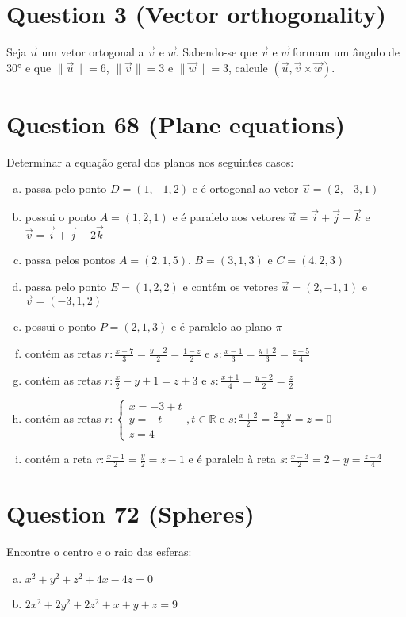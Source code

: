 \documentclass{article}
\begin{document}
\section*{Question 3 (Vector orthogonality)}
Seja $\vec{u}$ um vetor ortogonal a $\vec{v}$ e $\vec{w}$. Sabendo-se que $\vec{v}$ e $\vec{w}$ formam um ângulo de $30°$ e que $\|\vec{u}\| = 6$, $\|\vec{v}\| = 3$ e $\|\vec{w}\| = 3$, calcule $(\vec{u}, \vec{v} \times \vec{w})$.

\section*{Question 68 (Plane equations)}
Determinar a equação geral dos planos nos seguintes casos:
\begin{enumerate}[a)]
\item passa pelo ponto $D = (1, -1, 2)$ e é ortogonal ao vetor $\vec{v} = (2, -3, 1)$
\item possui o ponto $A = (1, 2, 1)$ e é paralelo aos vetores $\vec{u} = \vec{i} + \vec{j} - \vec{k}$ e $\vec{v} = \vec{i} + \vec{j} - 2\vec{k}$
\item passa pelos pontos $A = (2, 1, 5)$, $B = (3, 1, 3)$ e $C = (4, 2, 3)$
\item passa pelo ponto $E = (1, 2, 2)$ e contém os vetores $\vec{u} = (2, -1, 1)$ e $\vec{v} = (-3, 1, 2)$
\item possui o ponto $P = (2, 1, 3)$ e é paralelo ao plano $\pi$
\item contém as retas $r: \frac{x-7}{3} = \frac{y-2}{2} = \frac{1-z}{2}$ e $s: \frac{x-1}{3} = \frac{y+2}{3} = \frac{z-5}{4}$
\item contém as retas $r: \frac{x}{2} - y + 1 = z + 3$ e $s: \frac{x+1}{4} = \frac{y-2}{2} = \frac{z}{2}$
\item contém as retas $r: \begin{cases} x = -3+t \\ y = -t \\ z = 4 \end{cases}, t \in \mathbb{R}$ e $s: \frac{x+2}{2} = \frac{2-y}{2} = z = 0$
\item contém a reta $r: \frac{x-1}{2} = \frac{y}{2} = z - 1$ e é paralelo à reta $s: \frac{x-3}{2} = 2-y = \frac{z-4}{4}$
\end{enumerate}

\section*{Question 72 (Spheres)}
Encontre o centro e o raio das esferas:
\begin{enumerate}[a)]
\item $x^2 + y^2 + z^2 + 4x - 4z = 0$
\item $2x^2 + 2y^2 + 2z^2 + x + y + z = 9$
\end{enumerate}
\end{document}
